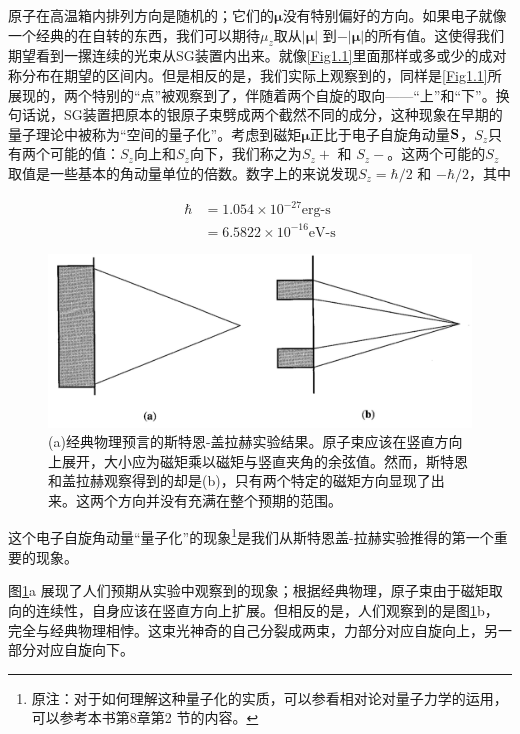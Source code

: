 \documentclass[UTF8,twoside]{ctexart}
\begin{document}
原子在高温箱内排列方向是随机的；它们的$\bm \mu$没有特别偏好的方向。如果电子就像一个经典的在自转的东西，我们可以期待$\mu_z$取从$\left|\bm \mu \right|$ 到$-\left|\bm \mu \right|$的所有值。这使得我们期望看到一摞连续的光束从SG装置内出来。就像{\ref{Fig1.1}}里面那样或多或少的成对称分布在期望的区间内。但是相反的是，我们实际上观察到的，同样是{\ref{Fig1.1}}所展现的，两个特别的“点”被观察到了，伴随着两个自旋的取向——“上”和“下”。换句话说，SG装置把原本的银原子束劈成两个截然不同的成分，这种现象在早期的量子理论中被称为“空间的量子化”。考虑到磁矩$\bm \mu$正比于电子自旋角动量$\bf S$，$S_z$只有两个可能的值：$S_z$向上和$S_z$向下，我们称之为$S_z+$ 和 $S_z-$。这两个可能的$S_z$取值是一些基本的角动量单位的倍数。数字上的来说发现$S_z = \hbar / 2$ 和 $-\hbar / 2$，其中

\begin{equation}
\begin{split}
\hbar & = 1.054 \times 10^{-27} \text{erg-s}\\
& = 6.5822 \times 10^{-16}\text{eV-s}
\end{split}
\end{equation}

\begin{figure}
\begin{centering}
\includegraphics[width = 12cm]{./Sakurai/Fig_1.2.png}
\caption{(a)经典物理预言的斯特恩-盖拉赫实验结果。原子束应该在竖直方向上展开，大小应为磁矩乘以磁矩与竖直夹角的余弦值。然而，斯特恩和盖拉赫观察得到的却是(b)，只有两个特定的磁矩方向显现了出来。这两个方向并没有充满在整个预期的范围。}
\label {Fig1.2}
\end{centering}
\end{figure}

\noindent 这个电子自旋角动量“量子化”的现象\footnote{原注：对于如何理解这种量子化的实质，可以参看相对论对量子力学的运用，可以参考本书第8章第2 节的内容。}是我们从斯特恩盖-拉赫实验推得的第一个重要的现象。

图{\ref{Fig1.2}}a 展现了人们预期从实验中观察到的现象；根据经典物理，原子束由于磁矩取向的连续性，自身应该在竖直方向上扩展。但相反的是，人们观察到的是图{\ref{Fig1.2}}b，完全与经典物理相悖。这束光神奇的自己分裂成两束，力部分对应自旋向上，另一部分对应自旋向下。
\end{document}
